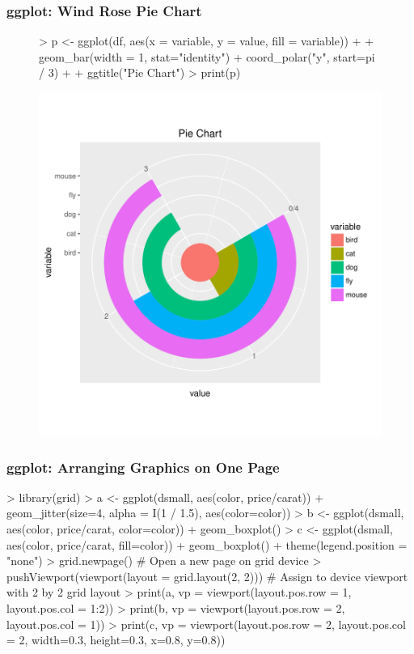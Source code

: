 \documentclass{beamer}
\begin{document}
\begin{frame}[containsverbatim]  
	\frametitle{ggplot: Wind Rose Pie Chart}
\scriptsize 
\begin{figure}
  \centering
\begin{Schunk}
\begin{Sinput}
> p <- ggplot(df, aes(x = variable, y = value, fill = variable)) + 
+        geom_bar(width = 1, stat="identity") + coord_polar("y", start=pi / 3) + 
+        ggtitle("Pie Chart") 
> print(p) 
\end{Sinput}
\end{Schunk}
\includegraphics{fig--073}
\label{fig:qplotscatter}
\end{figure}
\end{frame}
\begin{frame}[containsverbatim]  
	\frametitle{ggplot: Arranging Graphics on One Page}
\vspace{0cm}
\tiny 
\begin{Schunk}
\begin{Sinput}
> library(grid)
> a <- ggplot(dsmall, aes(color, price/carat)) + geom_jitter(size=4, alpha = I(1 / 1.5), aes(color=color))
> b <- ggplot(dsmall, aes(color, price/carat, color=color)) + geom_boxplot()
> c <- ggplot(dsmall, aes(color, price/carat, fill=color)) + geom_boxplot() + theme(legend.position = "none")
> grid.newpage() # Open a new page on grid device
> pushViewport(viewport(layout = grid.layout(2, 2))) # Assign to device viewport with 2 by 2 grid layout 
> print(a, vp = viewport(layout.pos.row = 1, layout.pos.col = 1:2))
> print(b, vp = viewport(layout.pos.row = 2, layout.pos.col = 1))
> print(c, vp = viewport(layout.pos.row = 2, layout.pos.col = 2, width=0.3, height=0.3, x=0.8, y=0.8))
\end{Sinput}
\end{Schunk}
\end{frame}
\end{document}
